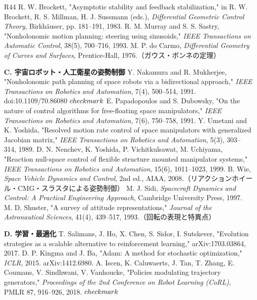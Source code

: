 \begin{thebibliography}{R44}
 R. W. Brockett, "Asymptotic stability and feedback stabilization," in R. W. Brockett, R. S. Millman, H. J. Sussmann (eds.), \textit{Differential Geometric Control Theory}, Birkhäuser, pp. 181–191, 1983.
 R. M. Murray and S. S. Sastry, "Nonholonomic motion planning: steering using sinusoids," \textit{IEEE Transactions on Automatic Control}, 38(5), 700–716, 1993.
 M. P. do Carmo, \textit{Differential Geometry of Curves and Surfaces}, Prentice-Hall, 1976.（ガウス・ボンネの定理）
\item[] \textbf{C. 宇宙ロボット・人工衛星の姿勢制御}
 Y. Nakamura and R. Mukherjee, "Nonholonomic path planning of space robots via a bidirectional approach," \textit{IEEE Transactions on Robotics and Automation}, 7(4), 500–514, 1991. doi:10.1109/70.86080 $\\checkmark$
 E. Papadopoulos and S. Dubowsky, "On the nature of control algorithms for free-floating space manipulators," \textit{IEEE Transactions on Robotics and Automation}, 7(6), 750–758, 1991.
 Y. Umetani and K. Yoshida, "Resolved motion rate control of space manipulators with generalized Jacobian matrix," \textit{IEEE Transactions on Robotics and Automation}, 5(3), 303–314, 1989.
 D. N. Nenchev, K. Yoshida, P. Vichitkulsawat, M. Uchiyama, "Reaction null-space control of flexible structure mounted manipulator systems," \textit{IEEE Transactions on Robotics and Automation}, 15(6), 1011–1023, 1999.
 B. Wie, \textit{Space Vehicle Dynamics and Control}, 2nd ed., AIAA, 2008.（リアクションホイール・CMG・スラスタによる姿勢制御）
 M. J. Sidi, \textit{Spacecraft Dynamics and Control: A Practical Engineering Approach}, Cambridge University Press, 1997.
 M. D. Shuster, "A survey of attitude representations," \textit{Journal of the Astronautical Sciences}, 41(4), 439–517, 1993.（回転の表現と特異点）
\item[] \textbf{D. 学習・最適化}
 T. Salimans, J. Ho, X. Chen, S. Sidor, I. Sutskever, "Evolution strategies as a scalable alternative to reinforcement learning," arXiv:1703.03864, 2017.
 D. P. Kingma and J. Ba, "Adam: A method for stochastic optimization," \textit{ICLR}, 2015. arXiv:1412.6980.
 A. Iscen, K. Caluwaerts, J. Tan, T. Zhang, E. Coumans, V. Sindhwani, V. Vanhoucke, "Policies modulating trajectory generators," \textit{Proceedings of the 2nd Conference on Robot Learning (CoRL)}, PMLR 87, 916–926, 2018. $\\checkmark$

\end{thebibliography}
